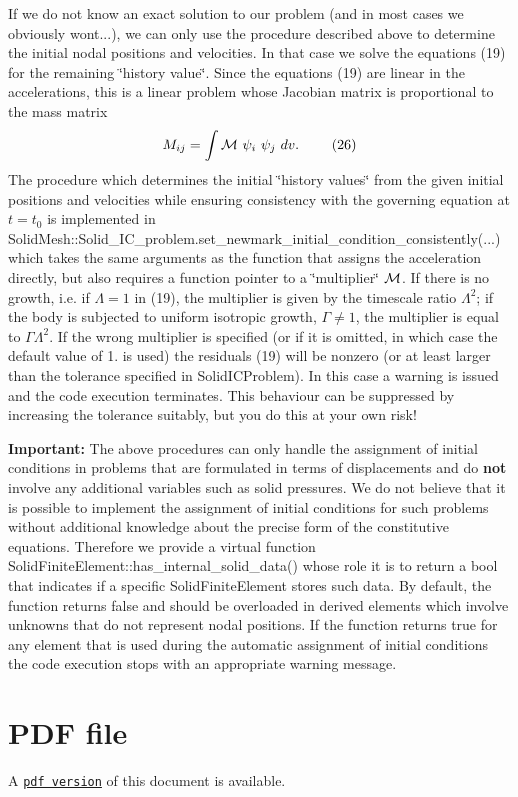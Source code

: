 If we do not know an exact solution to our problem (and in most cases we obviously won\textquotesingle{}t...), we can only use the procedure described above to determine the initial nodal positions and velocities. In that case we solve the equations (19) for the remaining \char`\"{}history value\char`\"{}. Since the equations (19) are linear in the accelerations, this is a linear problem whose Jacobian matrix is proportional to the mass matrix \[ M_{ij} = \int {\cal M} \ \psi_i \ \psi_j \ dv. \ \ \ \ \ \ \ (26) \] The procedure which determines the initial \char`\"{}history values\char`\"{} from the given initial positions and velocities while ensuring consistency with the governing equation at $ t = t_0$ is implemented in {\ttfamily Solid\+Mesh\+::\+Solid\+\_\+\+I\+C\+\_\+problem.\+set\+\_\+newmark\+\_\+initial\+\_\+condition\+\_\+consistently}(...) which takes the same arguments as the function that assigns the acceleration directly, but also requires a function pointer to a \char`\"{}multiplier\char`\"{} $ {\cal M} $. If there is no growth, i.\+e. if $\Lambda=1$ in (19), the multiplier is given by the timescale ratio $\Lambda^2$; if the body is subjected to uniform isotropic growth, $\Gamma \ne 1$, the multiplier is equal to $\Gamma \Lambda^2$. If the wrong multiplier is specified (or if it is omitted, in which case the default value of 1. is used) the residuals (19) will be nonzero (or at least larger than the tolerance specified in {\ttfamily Solid\+I\+C\+Problem}). In this case a warning is issued and the code execution terminates. This behaviour can be suppressed by increasing the tolerance suitably, but you do this at your own risk!

{\bfseries Important\+:} The above procedures can only handle the assignment of initial conditions in problems that are formulated in terms of displacements and do {\bfseries not} involve any additional variables such as solid pressures. We do not believe that it is possible to implement the assignment of initial conditions for such problems without additional knowledge about the precise form of the constitutive equations. Therefore we provide a virtual function {\ttfamily Solid\+Finite\+Element\+::has\+\_\+internal\+\_\+solid\+\_\+data()} whose role it is to return a bool that indicates if a specific {\ttfamily Solid\+Finite\+Element} stores such data. By default, the function returns {\ttfamily false} and should be overloaded in derived elements which involve unknowns that do not represent nodal positions. If the function returns {\ttfamily true} for any element that is used during the automatic assignment of initial conditions the code execution stops with an appropriate warning message.



 

 \hypertarget{index_pdf}{}\section{P\+D\+F file}\label{index_pdf}
A \href{../latex/refman.pdf}{\tt pdf version} of this document is available. 
